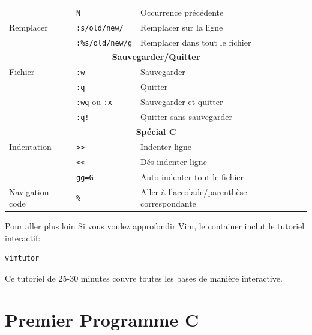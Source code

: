 \documentclass[10pt,a4paper]{article}
\begin{document}
\begin{center}
\begin{tabular}{|l|l|p{6cm}|}
& \texttt{N} & Occurrence précédente \\
Remplacer & \texttt{:s/old/new/} & Remplacer sur la ligne \\
& \texttt{:\%s/old/new/g} & Remplacer dans tout le fichier \\
\hline
\hline
\multicolumn{3}{|c|}{\textbf{Sauvegarder/Quitter}} \\
\hline
Fichier & \texttt{:w} & Sauvegarder \\
& \texttt{:q} & Quitter \\
& \texttt{:wq} ou \texttt{:x} & Sauvegarder et quitter \\
& \texttt{:q!} & Quitter sans sauvegarder \\
\hline
\hline
\multicolumn{3}{|c|}{\textbf{Spécial C}} \\
\hline
Indentation & \texttt{>>} & Indenter ligne \\
& \texttt{<<} & Dés-indenter ligne \\
& \texttt{gg=G} & Auto-indenter tout le fichier \\
Navigation code & \texttt{\%} & Aller à l'accolade/parenthèse correspondante \\
\hline
\end{tabular}
\end{center}

\begin{infobox}{Pour aller plus loin}
Si vous voulez approfondir Vim, le container inclut le tutoriel interactif:
\begin{verbatim}
vimtutor
\end{verbatim}
Ce tutoriel de 25-30 minutes couvre toutes les bases de manière interactive.
\end{infobox}

\section{Premier Programme C}
\end{document}
